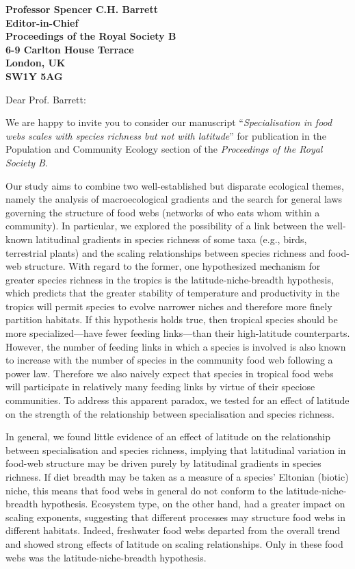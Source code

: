 \documentclass[12pt]{letter}
\newcommand{\mytitle}{\emph{Specialisation in food webs scales with species richness but not with latitude}}
\newcommand{\myjournal}{\emph{Proceedings of the Royal Society B}}
\begin{document}
\begin{letter}{\bf Professor Spencer C.H. Barrett\\
               Editor-in-Chief\\
               Proceedings of the Royal Society B\\
               6-9 Carlton House Terrace\\
               London, UK\\
               SW1Y 5AG\\
                }

\opening{Dear Prof. Barrett:}

We are happy to invite you to consider our manuscript 
``\mytitle'' for publication in the Population and Community Ecology section of the \myjournal. 

Our study aims to combine two well-established but disparate ecological
themes, namely the analysis of macroecological gradients and the search for
general laws governing the structure of food webs (networks of who eats whom
within a community). In particular, we explored the possibility of a link
between the well-known latitudinal gradients in species richness of some taxa
(e.g., birds, terrestrial plants) and the scaling relationships between
species richness and food-web structure. With regard to the former, one
hypothesized mechanism for greater species richness in the tropics is the
latitude-niche-breadth hypothesis, which predicts that the greater stability
of temperature and productivity in the tropics will permit species to evolve
narrower niches and therefore more finely partition habitats. If this
hypothesis holds true, then tropical species should be more specialized---have
fewer feeding links---than their high-latitude counterparts. However, the
number of feeding links in which a species is involved is also known to
increase with the number of species in the community food web following a
power law. Therefore we also naively expect that species in tropical food webs
will participate in relatively many feeding links by virtue of their speciose
communities. To address this apparent paradox, we tested for an effect of
latitude on the strength of the relationship between specialisation and species 
richness.


In general, we found little evidence of an effect of latitude on the
relationship between specialisation and species richness, implying that
latitudinal variation in food-web structure may be driven purely by
latitudinal gradients in species richness. If diet breadth may be taken as a
measure of a species' Eltonian (biotic) niche, this means that food webs
in general do not conform to the latitude-niche-breadth hypothesis. Ecosystem
type, on the other hand, had a greater impact on scaling exponents, suggesting
that different processes may structure food webs in different habitats.
Indeed, freshwater food webs departed from the overall trend and showed strong
effects of latitude on scaling relationships. Only in these food webs was the
latitude-niche-breadth hypothesis.



\end{letter}
\end{document}
